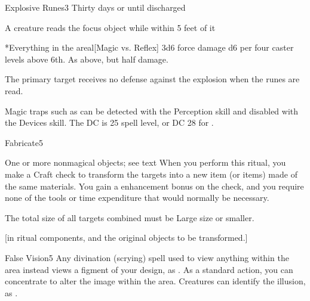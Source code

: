 \begin{spellsection}{Explosive Runes}{3}
\spelldur Thirty days or until discharged \dismissable
\spellline
\begin{spelltrigger}{A creature reads the focus object while within 5 feet of it}
    \begin{spelltargets}*{Everything in the area}l[Magic vs. Reflex]
        \spellsuccess 3d6 force damage \add d6 per four caster levels above 6th.
        \spellfailure As above, but half damage.
    \end{spelltargets}
\end{spelltrigger}
\spellnotes The primary target receives no defense against the explosion when the runes are read.

Magic traps such as  can be detected with the Perception skill and disabled with the Devices skill. The DC is 25 \add spell level, or DC 28 for .
\end{spellsection}

\begin{spellsection}{Fabricate}{5}
\spellrng{\rngclose}
\begin{spelltargets}{One or more nonmagical objects; see text}
    \spelleffect When you perform this ritual, you make a Craft check to transform the targets into a new item (or items) made of the same materials. You gain a  enhancement bonus on the check, and you require none of the tools or time expenditure that would normally be necessary.

    The total size of all targets combined must be Large size or smaller. 
\end{spelltargets}
[in ritual components, and the original objects to be transformed.]
\end{spellsection}

\begin{spellsection}{False Vision}{5}
\spelldur \durext \dismissable
{}
\spellline
\spelleffect Any divination (scrying) spell used to view anything within the area instead views a figment of your design, as . As a standard action, you can concentrate to alter the image within the area.
\spellnotes Creatures can identify the illusion, as .
\end{spellsection}

